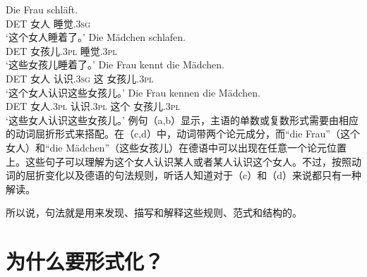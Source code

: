 \eal
\label{Beispiel-mit-Kongruenz}
\ex 
\gll Die Frau schläft.\\
     DET 女人 睡觉.\textsc{3sg}\\
\glt `这个女人睡着了。'
\ex 
\gll Die Mädchen schlafen.\\
     DET 女孩儿.\textsc{3pl} 睡觉.\textsc{3pl}\\
\glt `这些女孩儿睡着了。'
\ex 
\gll Die Frau kennt die Mädchen.\\
     DET 女人 认识.\textsc{3sg} 这 女孩儿.\textsc{3pl}\\
\glt `这个女人认识这些女孩儿。'
\ex 
\gll Die Frau kennen die Mädchen.\\
     DET 女人.\textsc{3pl} 认识.\textsc{3pl} 这个 女孩儿.\textsc{3pl}\\
\glt `这些女人认识这些女孩儿。'
\zl
例句（a,b）显示，主语的单数或复数形式需要由相应的动词屈折形式来搭配。在（c,d）中，动词带两个论元成分，而“die Frau”（这个女人）和“die Mädchen”（这些女孩儿）在德语中可以出现在任意一个论元位置上。这些句子可以理解为这个女人认识某人或者某人认识这个女人。不过，按照动词的屈折变化以及德语的句法规则，听话人知道对于（c）和（d）来说都只有一种解读。
 
所以说，句法就是用来发现、描写和解释这些规则、范式和结构的。

\section{为什么要形式化？}
\label{sec-formal}

